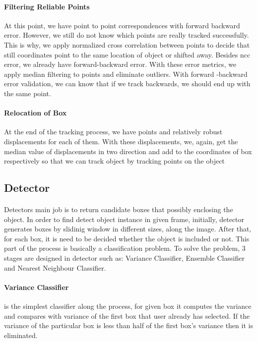 \documentclass{article}
\begin{document}
            \paragraph{Filtering Reliable Points}
                At this point, we have point to point correspondences with forward backward error. However, we still do not know which points
                are really tracked successfully. This is why, we apply normalized cross correlation between points to decide that
                still coordinates point to the same location of object or shifted away.
                Besides ncc error, we already have forward-backward error. With these error metrics, we apply median filtering to points and eliminate outliers.
                With forward -backward error validation, we can know that if we track backwards, we should end up with the same point.
            \paragraph{Relocation of Box}
                At the end of the tracking process, we have points and relatively robust displacements for each of them.
                With these displacements, we, again, get the median value of displacements in two direction and add
                to the coordinates of box respectively so that we can track object by tracking points
                on the object
        \subsection{Detector}
            \paragraph{}
                Detectors main job is to return candidate boxes that possibly enclosing the object. In order to find
                detect object instance in given frame, initially, detector generates boxes by slidinig window in different sizes,
                along the image. After that, for each box, it is need to be decided whether the object is included or not.
                This part of the process is basically a classification problem. To solve the problem, 3 stages are designed
                in detector such as: Variance Classifier, Ensemble Classifier and Nearest Neighbour Classifier.

                \paragraph{Variance Classifier} is the simplest classifier along the process, for given box it computes
                the variance and compares with variance of the first box that user already has selected.
                If the variance of the particular box is less than half of the first box's variance then it is
                eliminated.
\end{document}
